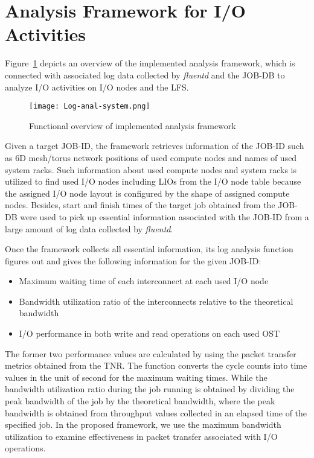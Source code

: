 \documentclass{jhps}
\begin{document}
\section{Analysis Framework for I/O Activities}
\label{sec:ANAL_SYS}

Figure~\ref{fig:LOG_ANAL_SYS} depicts an overview of the implemented analysis framework,
which is connected with associated log data collected by {\itshape fluentd}
and the JOB-DB to analyze I/O activities on I/O nodes and the LFS.
%
\begin{figure}[tb]
\centering
\texttt{[image: Log-anal-system.png]}
\caption{Functional overview of implemented analysis framework}
\label{fig:LOG_ANAL_SYS}
\end{figure}
%
Given a target JOB-ID, the framework retrieves information of the JOB-ID
such as 6D mesh/torus network positions of used compute nodes and names of
used system racks.
Such information about used compute nodes and system racks is utilized
to find used I/O nodes including LIOs from the I/O node table
because the assigned I/O node layout is configured by the shape of assigned compute nodes.
Besides, start and finish times of the target job obtained from the JOB-DB were
used to pick up essential information associated with the JOB-ID
from a large amount of log data collected by {\itshape fluentd}.

Once the framework collects all essential information, its log analysis function
figures out and gives the following information for the given JOB-ID:
\begin{itemize}
\item Maximum waiting time of each interconnect at each used I/O node
\item Bandwidth utilization ratio of the interconnects relative to the theoretical bandwidth
\item I/O performance in both write and read operations on each used OST
\end{itemize}
%

The former two performance values are calculated by using the packet transfer metrics
obtained from the TNR. The function converts the cycle counts into time values
in the unit of second for the maximum waiting times.
While the bandwidth utilization ratio during the job running is obtained by
dividing the peak bandwidth of the job by the theoretical bandwidth,
where the peak bandwidth is obtained from throughput values collected
in an elapsed time of the specified job. In the proposed framework,
we use the maximum bandwidth utilization to examine effectiveness
in packet transfer associated with I/O operations.
\end{document}
